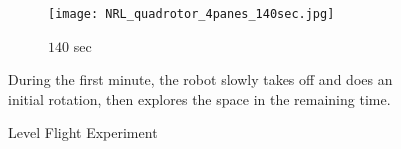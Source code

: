 \begin{figure}[!t]
{\begin{subfigure}[t]{0.4\columnwidth}
           	\centering
          	\texttt{[image: NRL\_quadrotor\_4panes\_140sec.jpg]}
        		\caption{$140$ sec}
    	\end{subfigure}
}
	\caption{Level Flight Experiment}
	\medskip
	\small
	During the first minute, the robot slowly takes off and does an initial rotation, then explores the space in the remaining time.
	\label{fig:expFilming}
\end{figure}


